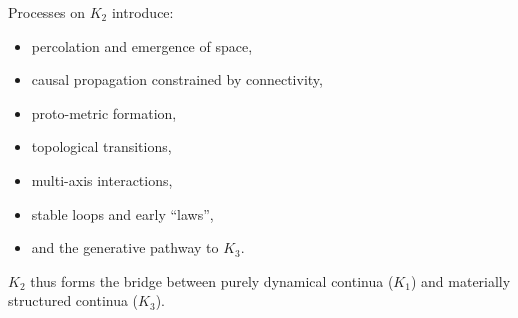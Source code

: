 Processes on $K_2$ introduce:

\begin{itemize}
    \item percolation and emergence of space,
    \item causal propagation constrained by connectivity,
    \item proto-metric formation,
    \item topological transitions,
    \item multi-axis interactions,
    \item stable loops and early “laws”,
    \item and the generative pathway to $K_3$.
\end{itemize}

$K_2$ thus forms the bridge between purely dynamical continua ($K_1$)
and materially structured continua ($K_3$).
